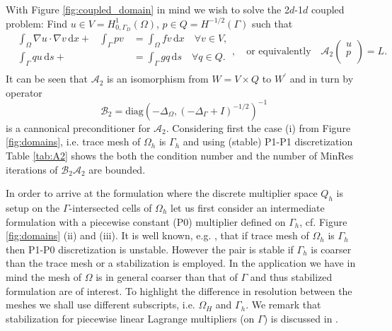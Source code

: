 With Figure \ref{fig:coupled_domain} in mind we wish to solve the 2$d$-1$d$
coupled problem: Find $u\in V=H^1_{0, \Gamma_{D}}(\Omega)$,
$p\in Q=H^{-1/2}(\Gamma)$ such that
\begin{equation}\label{eq:A2}
\begin{aligned}
  &\int_{\Omega}\nabla u\cdot\nabla v\,\mathrm{d}x + &{\int_{\Gamma}p v} &= \int_{\Omega}f v\,\mathrm{d}x\quad\forall v\in V,\\
  &{\int_{\Gamma}q u\,\mathrm{d}s} + &\phantom{\int{\Gamma}p v} &= \int_{\Gamma}g q\,\mathrm{d}s\quad\forall q\in Q.\\
\end{aligned},
\quad\mbox{or equivalently}\quad
\mathcal{A}_2\begin{pmatrix}
u\\
p\\
\end{pmatrix} = L.
\end{equation}
%
It can be seen that $\mathcal{A}_2$ is an isomorphism from $W=V\times Q$
to $W^{'}$ and in turn by \cite{mardal2011preconditioning} operator
\[
\mathcal{B}_2=\text{diag}(-\Delta_{\Omega}, (-\Delta_{\Gamma}+I)^{-1/2})^{-1}
\]
is a cannonical preconditioner for $\mathcal{A}_2$. Considering first the
case (i) from Figure \ref{fig:domains}, i.e. trace mesh of $\Omega_h$ is
$\Gamma_h$ and using (stable) P1-P1 discretization Table \ref{tab:A2} shows
the both the condition number and the number of MinRes iterations of $\mathcal{B}_2\mathcal{A}_2$
are bounded.

In order to arrive at the formulation where the discrete multiplier space
$Q_h$ is setup on the $\Gamma$-intersected cells of $\Omega_h$ let us first
consider an intermediate formulation with a piecewise constant (P0) multiplier defined
on $\Gamma_h$, cf. Figure \ref{fig:domains} (ii) and (iii). It is well known, e.g.
\cite[Ch 11.3]{steinbach2007numerical}, that if trace mesh of $\Omega_h$ is $\Gamma_h$ then P1-P0 discretization is
unstable. However the pair is stable if $\Gamma_h$ is coarser than the trace
mesh or a stabilization is employed. In the application we have in mind
the mesh of $\Omega$ is in general coarser than that of $\Gamma$ and thus
stabilized formulation are of interest. To highlight the difference in resolution
between the meshes we shall use different subscripts, i.e. $\Omega_H$ and
$\Gamma_h$. We remark that stabilization for piecewise linear Lagrange multipliers
(on $\Gamma$) is discussed in \cite{burman2009interior}.

